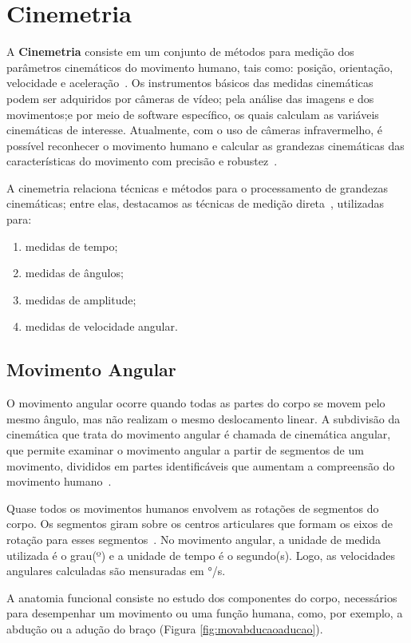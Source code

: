 \section{Cinemetria}
A \textbf{Cinemetria} consiste em um conjunto de métodos para medição dos parâmetros cinemáticos do movimento humano, tais como: posição, orientação, velocidade e aceleração~\cite{mcginnis2013biomechanics}. Os instrumentos básicos das medidas cinemáticas podem ser adquiridos por câmeras de vídeo; pela análise das imagens e dos movimentos;e  por meio de software específico, os quais calculam as variáveis cinemáticas de interesse. Atualmente, com o uso de câmeras infravermelho, é possível reconhecer o movimento humano e calcular as grandezas cinemáticas das características do movimento com precisão e robustez~\cite{gabel2012}.

A cinemetria relaciona técnicas e métodos para o processamento de grandezas cinemáticas; entre elas, destacamos as técnicas de medição direta~\cite{mcginnis2013biomechanics}, utilizadas para: 
\begin{enumerate}
	\item medidas de tempo;
	\item medidas de ângulos;
	\item medidas de amplitude;
	\item medidas de velocidade angular.
\end{enumerate}

\subsection{Movimento Angular}
O movimento angular ocorre quando todas as partes do corpo se movem pelo mesmo ângulo, mas não realizam o mesmo deslocamento linear. A subdivisão da cinemática que trata do movimento angular é chamada de cinemática angular, que permite examinar o movimento angular a partir de segmentos de um movimento, divididos em partes identificáveis que aumentam a compreensão do movimento humano~\cite{hamill1999bases}. 

Quase todos os movimentos humanos envolvem as rotações de segmentos do corpo. Os segmentos giram sobre os centros articulares que formam os eixos de rotação para esses segmentos~\cite{hamill1999bases}. No movimento angular, a unidade de medida utilizada é o grau(º) e a unidade de tempo é o segundo(s). Logo, as velocidades angulares calculadas são mensuradas em °/s.

A anatomia funcional consiste no estudo dos componentes do corpo, necessários para desempenhar um movimento ou uma função humana, como, por exemplo, a abdução ou a adução do braço (Figura \ref{fig:movabducaoaducao}).


